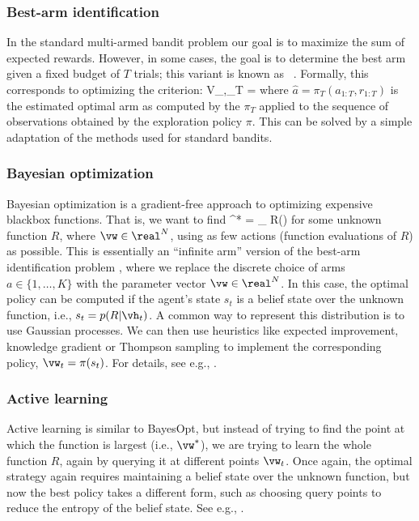 \subsubsection{Best-arm identification}

In the standard multi-armed bandit problem
our goal is to maximize the sum of expected
rewards.
However, in some cases, the goal is to determine 
the best arm given a fixed budget of $T$ trials;
this variant is
known as ~\citep{Audibert10Best}.
Formally, this corresponds to optimizing the 
criterion:
\be
V_{\pi,\pi_T} = 
\ee
where $\hat{a} = \pi_T(a_{1:T}, r_{1:T})$ is the estimated optimal arm
as computed by the  $\pi_T$
applied to the sequence of observations obtained by the exploration policy $\pi$.
This can be solved by a simple adaptation of the methods used for standard bandits.

\subsubsection{Bayesian optimization}
\label{sec:BO}

Bayesian optimization is a gradient-free approach to optimizing expensive blackbox functions.
That is, we want to find
\be
\vw^* = \argmax_{\vw} R(\vw)
\ee
for some unknown function $R$,
where $\vw \in \real^N$,
using as few actions (function evaluations of $R$) as possible.
This is essentially  an ``infinite arm'' version of the best-arm identification problem
\citep{Toussaint2014},
where we replace the discrete choice of arms $a \in \{1,\ldots,K\}$
with the parameter vector $\vw \in \real^N$.
In this case, the optimal policy can be computed
if the agent's state $s_t$ is a belief state over 
the unknown function, i.e., $s_t=p(R|\vh_t)$.
A common way to represent this distribution is to use Gaussian processes.
We can then use heuristics like expected improvement, knowledge gradient
or Thompson sampling
to implement the corresponding policy, $\vw_t=\pi(s_t)$.
For details, see e.g., \citep{Garnett2023}.

\subsubsection{Active learning}

Active learning is similar to BayesOpt, but instead of trying to find the point
at which the function is largest (i.e., $\vw^*$), we are trying to learn
the whole function $R$, again by querying it at different points $\vw_t$.
Once again, the optimal strategy again requires maintaining a belief state over the unknown function,
but now the best policy takes a different form, such as choosing query points
to reduce the entropy
of the belief state.
See e.g., \citep{Smith2023}.


